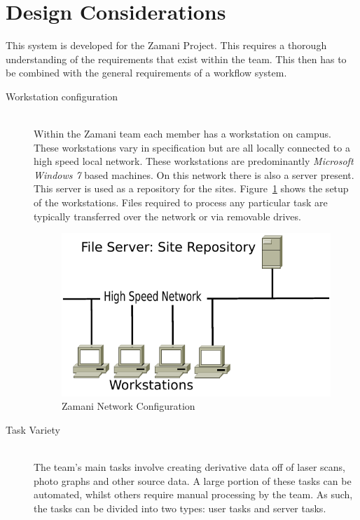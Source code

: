 \documentclass[12pt,a4paper]{report}
\begin{document}
\section{Design Considerations\label{design_consdierations}}
This system is developed for the Zamani Project. This requires
a thorough understanding of the requirements that exist within
the team. This then has to be combined with the general requirements
of a workflow system.
\begin{description}
    \item[Workstation configuration] \hfill \\
        Within the Zamani team each member has a workstation on campus.
        These workstations vary in specification but are all locally
        connected to a high speed local network. These workstations are
        predominantly \emph{Microsoft Windows 7} based machines.  On this
        network there is also a server present. This server is used as
        a repository for the sites. Figure~\ref{network_setup} shows the setup
        of the workstations. Files required to process any particular task are
        typically transferred over the network or via removable drives.
\begin{figure}[!h]
    \begin{center}
        \includegraphics[scale=0.6]{figures/networklayout.pdf}
    \end{center}
    \caption{Zamani Network Configuration}
    \label{network_setup}
\end{figure}
    \item[Task Variety] \hfill \\
        The team's main tasks involve creating derivative data off of laser
        scans, photo graphs and other source data. A large portion of these
        tasks can be automated, whilst others require manual processing by the
        team. As such, the tasks can be divided into two types: user tasks and
        server tasks.



\end{description}
\end{document}
